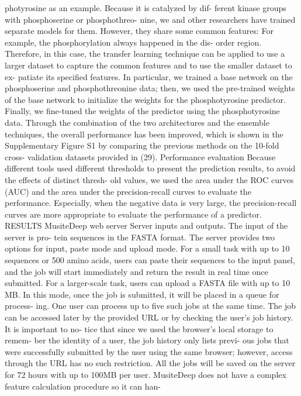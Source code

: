 photyrosine as an example. Because it is catalyzed by dif-
ferent kinase groups with phosphoserine or phosphothreo-
nine, we and other researchers have trained separate models
for them. However, they share some common features: For
example, the phosphorylation always happened in the dis-
order region. Therefore, in this case, the transfer learning
technique can be applied to use a larger dataset to capture
the common features and to use the smaller dataset to ex-
patiate its specified features. In particular, we trained a base
network on the phosphoserine and phosphothreonine data;
then, we used the pre-trained weights of the base network
to initialize the weights for the phosphotyrosine predictor.
Finally, we fine-tuned the weights of the predictor using the
phosphotyrosine data.
Through the combination of the two architectures and
the ensemble techniques, the overall performance has been
improved, which is shown in the Supplementary Figure S1
by comparing the previous methods on the 10-fold cross-
validation datasets provided in (29).
Performance evaluation
Because different tools used different thresholds to present
the prediction results, to avoid the effects of distinct thresh-
old values, we used the area under the ROC curves (AUC)
and the area under the precision-recall curves to evaluate
the performance. Especially, when the negative data is very
large, the precision-recall curves are more appropriate to
evaluate the performance of a predictor.
RESULTS
MusiteDeep web server
Server inputs and outputs.
The input of the server is pro-
tein sequences in the FASTA format. The server provides
two options for input, paste mode and upload mode. For
a small task with up to 10 sequences or 500 amino acids,
users can paste their sequences to the input panel, and the
job will start immediately and return the result in real time
once submitted. For a larger-scale task, users can upload
a FASTA file with up to 10 MB. In this mode, once the
job is submitted, it will be placed in a queue for process-
ing. One user can process up to five such jobs at the same
time. The job can be accessed later by the provided URL
or by checking the user’s job history. It is important to no-
tice that since we used the browser’s local storage to remem-
ber the identity of a user, the job history only lists previ-
ous jobs that were successfully submitted by the user using
the same browser; however, access through the URL has no
such restriction. All the jobs will be saved on the server for
72 hours with up to 100MB per user. MusiteDeep does not
have a complex feature calculation procedure so it can han-
